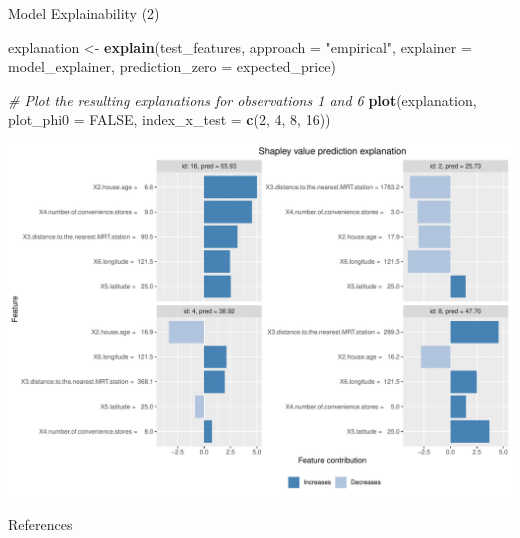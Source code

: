 \documentclass[12pt,ignorenonframetext,]{beamer}
\newenvironment{Shaded}{\begin{snugshade}}{\end{snugshade}}
\newcommand{\CommentTok}[1]{\textcolor[rgb]{0.56,0.35,0.01}{\textit{#1}}}
\newcommand{\DataTypeTok}[1]{\textcolor[rgb]{0.13,0.29,0.53}{#1}}
\newcommand{\DecValTok}[1]{\textcolor[rgb]{0.00,0.00,0.81}{#1}}
\newcommand{\KeywordTok}[1]{\textcolor[rgb]{0.13,0.29,0.53}{\textbf{#1}}}
\newcommand{\NormalTok}[1]{#1}
\newcommand{\OtherTok}[1]{\textcolor[rgb]{0.56,0.35,0.01}{#1}}
\newcommand{\StringTok}[1]{\textcolor[rgb]{0.31,0.60,0.02}{#1}}
\begin{document}
\begin{frame}[fragile]{Model Explainability (2)}
\protect\hypertarget{model-explainability-2}{}

\tiny

\begin{Shaded}
\begin{Highlighting}[]
\NormalTok{explanation <-}\StringTok{ }\KeywordTok{explain}\NormalTok{(test_features, }\DataTypeTok{approach =} \StringTok{"empirical"}\NormalTok{, }
                       \DataTypeTok{explainer =}\NormalTok{ model_explainer, }\DataTypeTok{prediction_zero =}\NormalTok{ expected_price)}

\CommentTok{# Plot the resulting explanations for observations 1 and 6}
\KeywordTok{plot}\NormalTok{(explanation, }\DataTypeTok{plot_phi0 =} \OtherTok{FALSE}\NormalTok{, }\DataTypeTok{index_x_test =} \KeywordTok{c}\NormalTok{(}\DecValTok{2}\NormalTok{, }\DecValTok{4}\NormalTok{, }\DecValTok{8}\NormalTok{, }\DecValTok{16}\NormalTok{))}
\end{Highlighting}
\end{Shaded}

\begin{center}\includegraphics[width=0.8\linewidth,height=0.7\textheight]{figs/unnamed-chunk-26} \end{center}

\normalsize

\end{frame}

\begin{frame}{References}
\protect\hypertarget{references}{}

\end{frame}

  
\end{document}
